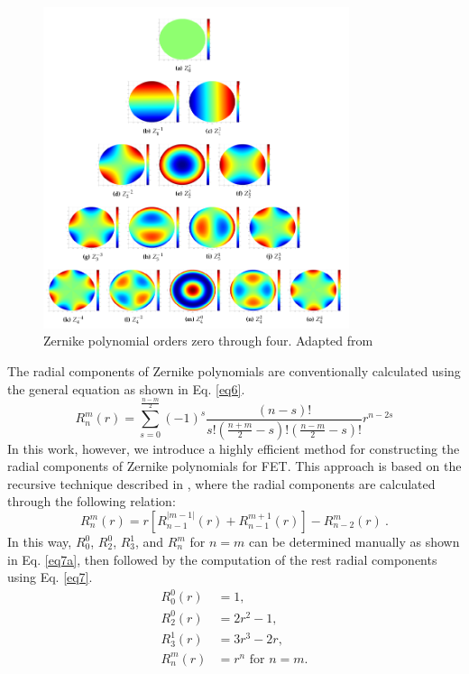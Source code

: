 \begin{figure}
    \centering
    \includegraphics[width=0.8\textwidth]{figs/zernike.png}
    \caption[Zernike polynomial orders zero through four]{Zernike polynomial orders zero through four. Adapted from \cite{ellis}}
    \label{fig_21}
\end{figure}

The radial components of Zernike polynomials are conventionally calculated using the general equation as shown in Eq. \ref{eq6}.
\begin{equation}
R_n^m(r) = \sum_{s=0}^{\frac{n-m}{2}} (-1)^s \frac{(n-s)!}{s! \left( \frac{n+m}{2} - s \right)! \left( \frac{n-m}{2} - s \right)!} r^{n-2s}
\label{eq6}
\end{equation}
In this work, however, we introduce a highly efficient method for constructing the radial components of Zernike polynomials for FET. This approach is based on the recursive technique described in \cite{honarvar}, where the radial components are calculated through the following relation:
\begin{equation}
    R_n^m\left(r\right)=r\left[R_{n-1}^{\left|m-1\right|}\left(r\right)+R_{n-1}^{m+1}\left(r\right)\right]-R_{n-2}^m\left(r\right)\ .
    \label{eq7}
\end{equation}
In this way, $R_0^0$, $R_2^0$, $R_3^1$, and $R_n^m$ for $n=m$ can be determined manually as shown in Eq. \ref{eq7a}, then followed by the computation of the rest radial components using Eq. \ref{eq7}.
\begin{equation}
    \begin{split}
    R_0^0(r) &= 1, \\
    R_2^0(r) &= 2r^2-1, \\
    R_3^1(r) &= 3r^3-2r, \\
    R_n^m(r) &= r^n \text{ for } n = m.
    \end{split}
    \label{eq7a}
\end{equation}

